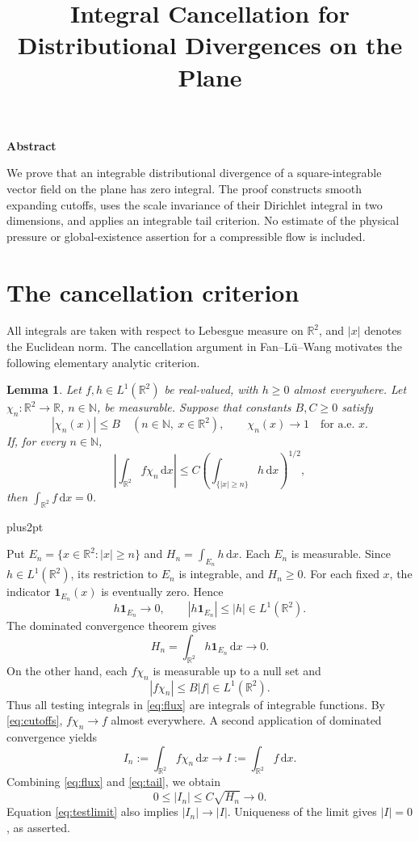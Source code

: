 \documentclass[10pt]{article}
\title{Integral Cancellation for Distributional Divergences on the Plane}
\author{}
\date{}
\makeatletter
\theoremstyle{lixinplain}
\newtheorem{lemma}[theorem]{Lemma}
\theoremstyle{lixindef}
\numberwithin{equation}{section}
\renewenvironment{proof}[1][\proofname]{\par
 \pushQED{\qed}\normalfont\topsep6pt plus2pt\relax
 \trivlist\item[\hskip\labelsep\sffamily\bfseries\itshape #1]\ignorespaces
}{\popQED\endtrivlist\@endpefalse}
\renewcommand{\maketitle}{\par\thispagestyle{firstpage}
 \begingroup\parindent0pt
 {\raggedright\sffamily\bfseries\fontsize{13}{15.6}\selectfont\@title\par}
 \ifx\@author\@empty\else\vskip9pt{\normalsize\@author\par}\fi
 \vskip14pt\endgroup}
\renewenvironment{abstract}{\par\noindent
 {\sffamily\bfseries Abstract}\par\nobreak\vskip2pt\noindent\ignorespaces}{\par\vskip8pt}
\newcommand{\R}{\mathbb{R}}
\newcommand{\dd}{\,\mathrm{d}x}
\makeatother
\begin{document}
\maketitle
\begin{abstract}
We prove that an integrable distributional divergence of a square-integrable vector field on the plane has zero integral. The proof constructs smooth expanding cutoffs, uses the scale invariance of their Dirichlet integral in two dimensions, and applies an integrable tail criterion. No estimate of the physical pressure or global-existence assertion for a compressible flow is included.
\end{abstract}
\section{The cancellation criterion}
All integrals are taken with respect to Lebesgue measure on $\R^2$, and $|x|$ denotes the Euclidean norm. The cancellation argument in Fan--L\"u--Wang \cite[Lemma 3.3]{FLW} motivates the following elementary analytic criterion.
\begin{lemma}\label{lem:cutoff}
Let $f,h\in L^1(\R^2)$ be real-valued, with $h\ge0$ almost everywhere. Let $\chi_n:\R^2\to\R$, $n\in\mathbb N$, be measurable. Suppose that constants $B,C\ge0$ satisfy
\begin{equation}\label{eq:cutoffs}
 |\chi_n(x)|\le B\quad(n\in\mathbb N,\ x\in\R^2),
 \qquad \chi_n(x)\longrightarrow1\quad\text{for a.e. }x.
\end{equation}
If, for every $n\in\mathbb N$,
\begin{equation}\label{eq:flux}
 \left|\int_{\R^2} f\chi_n\dd\right|
 \le C\left(\int_{\{|x|\ge n\}}h\dd\right)^{1/2},
\end{equation}
then $\int_{\R^2}f\dd=0$.
\end{lemma}
\begin{proof}
Put $E_n=\{x\in\R^2:|x|\ge n\}$ and $H_n=\int_{E_n}h\dd$.
Each $E_n$ is measurable. Since $h\in L^1(\R^2)$, its restriction to $E_n$ is integrable, and $H_n\ge0$. For each fixed $x$, the indicator $\mathbf1_{E_n}(x)$ is eventually zero. Hence
\[
 h\mathbf1_{E_n}\longrightarrow0,
 \qquad |h\mathbf1_{E_n}|\le|h|\in L^1(\R^2).
\]
The dominated convergence theorem gives
\begin{equation}\label{eq:tail}
 H_n=\int_{\R^2}h\mathbf1_{E_n}\dd\longrightarrow0.
\end{equation}
On the other hand, each $f\chi_n$ is measurable up to a null set and
\[
 |f\chi_n|\le B|f|\in L^1(\R^2).
\]
Thus all testing integrals in \eqref{eq:flux} are integrals of integrable functions. By \eqref{eq:cutoffs}, $f\chi_n\to f$ almost everywhere. A second application of dominated convergence yields
\begin{equation}\label{eq:testlimit}
 I_n:=\int_{\R^2}f\chi_n\dd\longrightarrow
 I:=\int_{\R^2}f\dd.
\end{equation}
Combining \eqref{eq:flux} and \eqref{eq:tail}, we obtain
\[
 0\le |I_n|\le C\sqrt{H_n}\longrightarrow0.
\]
Equation \eqref{eq:testlimit} also implies $|I_n|\to|I|$. Uniqueness of the limit gives $|I|=0$, as asserted.
\end{proof}
\end{document}
